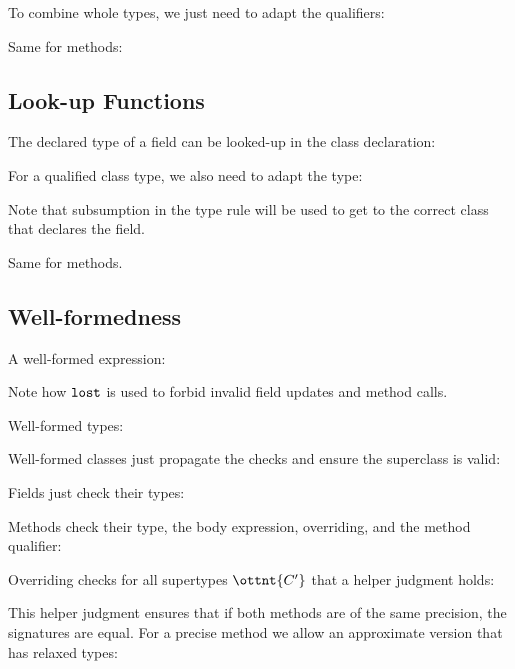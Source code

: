 \ottdefnqcombqrules


To combine whole types, we just need to adapt the qualifiers:

\ottdefnqcombtrules


Same for methods:

\ottdefnqcombmsrules



\subsection{Look-up Functions}

The declared type of a field can be looked-up in the class
declaration:

\ottdefnsftypec


For a qualified class type, we also need to adapt the type:

\ottdefnsftypet


Note that subsumption in the type rule will be used to get to the
correct class that declares the field.

Same for methods.

\ottdefnsmsigc


\ottdefnsmsigt


\subsection{Well-formedness}

A well-formed expression:

\ottdefntyperules


Note how $ \texttt{\upshape{lost}\,\!} $ is used to forbid invalid field updates and method
calls.


Well-formed types:

\ottdefnwftype


Well-formed classes just propagate the checks and ensure the
superclass is valid:

\ottdefnwfclass


Fields just check their types:

\ottdefnwffd


Methods check their type, the body expression, overriding, and the
method qualifier:

\ottdefnwfmd


Overriding checks for all supertypes $\ottnt{C'}$ that a helper judgment
holds:

\ottdefnoverride


This helper judgment ensures that if both methods are of the same
precision, the signatures are equal. For a precise method we allow an
approximate version that has relaxed types:

